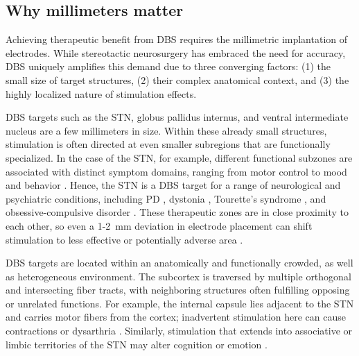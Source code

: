 \subsection{Why millimeters matter}
\label{sec:whymm}
Achieving therapeutic benefit from DBS requires the millimetric implantation of electrodes. While stereotactic neurosurgery has embraced the need for accuracy, DBS uniquely amplifies this demand due to three converging factors: (1) the small size of target structures, (2) their complex anatomical context, and (3) the highly localized nature of stimulation effects.

DBS targets such as the STN, globus pallidus internus, and ventral intermediate nucleus are a few millimeters in size. Within these already small structures, stimulation is often directed at even smaller subregions that are functionally specialized. In the case of the STN, for example, different functional subzones are associated with distinct symptom domains, ranging from motor control to mood and behavior \cite{Hollunder2024-wc}. Hence, the STN is a DBS target for a range of neurological and psychiatric conditions, including PD \cite{Deuschl2006-ar}, dystonia \cite{Ostrem2017-rw}, Tourette’s syndrome \cite{Mallet2008-ky}, and obsessive-compulsive disorder \cite{Dai2022-uy}. These therapeutic zones are in close proximity to each other, so even a 1-2~mm deviation in electrode placement can shift stimulation to less effective or potentially adverse area \cite{Akram2017-ru}.

DBS targets are located within an anatomically and functionally crowded, as well as heterogeneous environment. The subcortex is traversed by multiple orthogonal and intersecting fiber tracts, with neighboring structures often fulfilling opposing or unrelated functions. For example, the internal capsule lies adjacent to the STN and carries motor fibers from the cortex; inadvertent stimulation here can cause contractions or dysarthria \cite{Tripoliti2011-ca}. Similarly, stimulation that extends into associative or limbic territories of the STN may alter cognition or emotion \cite{Mallet2007-ur}.

